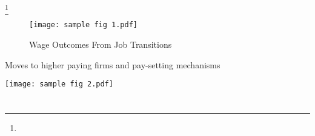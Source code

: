 \documentclass[11pt,twocolumn,openany,leqno]{e61-research-note}
\begin{document}
\lipsum[2]\footnote{\lipsum[][1-4]}

\lipsum[3]

\begin{figure}[htb]
\caption{Wage Outcomes From Job Transitions}\label{fig:stp-wages}
\texttt{[image: sample fig 1.pdf]}
\end{figure}

\newpage

\begin{Boxx}[label=box-pay]{Moves to higher paying firms and pay-setting mechanisms}
\setlength{\parskip}{\baselineskip}

\lipsum[8-12]

\begin{minipage}{\textwidth}
  \label{fig:award-trans}
  \texttt{[image: sample fig 2.pdf]}
\end{minipage}

\end{Boxx}

\chapter{\lipsum[][10]}

\lipsum[1-6]

\printbibliography[title={References}]
\end{document}
